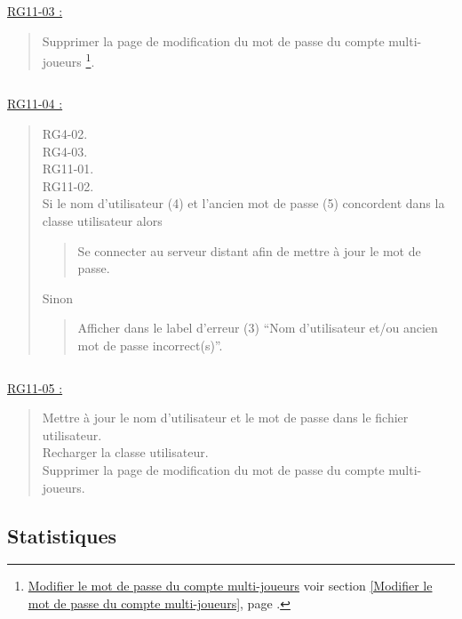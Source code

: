 \documentclass{report}
\begin{document}
			\underline{RG11-03 :}
				\begin{quote}
					Supprimer la page de modification du mot de passe du compte multi-joueurs%
						\footnote[1]{
							\hyperlink{Modifier le mot de passe du compte multi-joueurs}{Modifier le mot de passe du compte multi-joueurs}
							\og voir section \ref{Modifier le mot de passe du compte multi-joueurs}, page \pageref{Modifier le mot de passe du compte multi-joueurs}.\fg
						}.
				\end{quote}
				
			$\,$
				
			\underline{RG11-04 :}
				\begin{quote}
					RG4-02.\\
					RG4-03.\\
					RG11-01.\\
					RG11-02.\\
					Si le nom d'utilisateur (4) et l'ancien mot de passe (5) concordent dans la classe utilisateur alors
					\begin{quote}
						Se connecter au serveur distant afin de mettre à jour le mot de passe.					
					\end{quote}
					Sinon
					\begin{quote}
						Afficher dans le label d'erreur (3) ``Nom d'utilisateur et/ou ancien mot de passe incorrect(s)''.
					\end{quote}
				\end{quote}

			$\,$					
					
			\underline{RG11-05 :}
				\begin{quote}
					Mettre à jour le nom d'utilisateur et le mot de passe dans le fichier utilisateur.\\
					Recharger la classe utilisateur.\\
					Supprimer la page de modification du mot de passe du compte multi-joueurs\footnotemark[1].
				\end{quote}
				
				
\newpage

	\subsection{Statistiques}
		
		\hypertarget{Statistiques}{}
		\label{Statistiques}
			
		\begin{center}
			
		\end{center}
		
\end{document}
